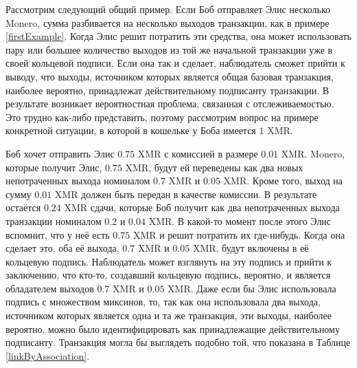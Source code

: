 \documentclass{mrl}
\begin{document}
Рассмотрим следующий общий пример. Если Боб отправляет Элис несколько Monero, сумма разбивается на несколько выходов транзакции, как в примере \ref{firstExample}. Когда Элис решит потратить эти средства, она может использовать пару или большее количество выходов из той же начальной транзакции уже в своей кольцевой подписи. Если она так и сделает, наблюдатель сможет прийти к выводу, что выходы, источником которых является общая базовая транзакция, наиболее вероятно, принадлежат действительному подписанту транзакции. В результате возникает вероятностная проблема, связанная с отслеживаемостью. Это трудно как-либо представить, поэтому рассмотрим вопрос на примере конкретной ситуации, в которой в кошельке у Боба имеется $1$ XMR.

Боб хочет отправить Элис $0.75$ XMR с комиссией в размере $0.01$ XMR. Monero, которые получит Элис, $0.75$ XMR, будут ей переведены как два новых непотраченных выхода номиналом $0.7$ XMR и $0.05$ XMR. Кроме того, выход на сумму $0.01$ XMR должен быть передан в качестве комиссии. В результате остаётся $0.24$ XMR сдачи, которые Боб получит как два непотраченных выхода транзакции номиналом $0.2$ и $0.04$ XMR. В какой-то момент после этого Элис вспомнит, что у неё есть $0.75$ XMR и решит потратить их где-нибудь. Когда она сделает это, оба её выхода, $0.7$ XMR и $0.05$ XMR, будут включены в её кольцевую подпись. Наблюдатель может взглянуть на эту подпись и прийти к заключению, что кто-то, создавший кольцевую подпись, вероятно, и является обладателем выходов $0.7$ XMR и $0.05$ XMR. Даже если бы Элис использовала подпись с множеством миксинов, то, так как она использовала два выхода, источником которых является одна и та же транзакция, эти выходы, наиболее вероятно, можно было идентифицировать как принадлежащие действительному подписанту. Транзакция могла бы выглядеть подобно той, что показана в Таблице \ref{linkByAssociation}.
\end{document}
